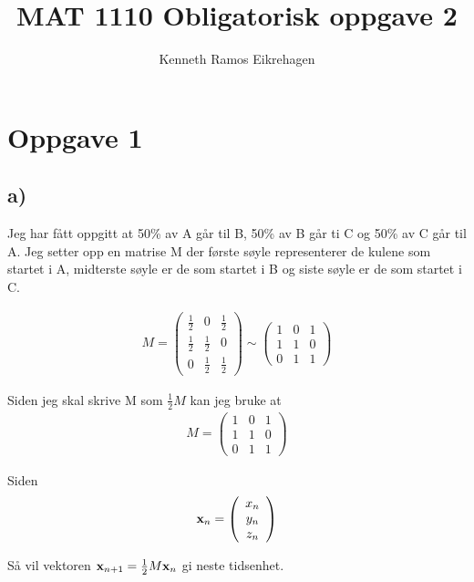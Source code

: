 \documentclass[a4paper,12pt,norsk]{article}
\title{MAT 1110 Obligatorisk oppgave 2}
\author{Kenneth Ramos Eikrehagen}
\begin{document}
\maketitle
\tableofcontents
\section{Oppgave 1}
\subsection{a)}
Jeg har fått oppgitt at 50\% av A går til B, 50\% av B går ti C og 50\% av C går til A. Jeg setter opp en matrise M der første søyle representerer de kulene som startet i A, midterste søyle er de som startet i B og siste søyle er de som startet i C. 

\begin{align*}
M =
\begin{pmatrix}
\frac{1}{2} & 0 & \frac{1}{2} \\
\frac{1}{2} & \frac{1}{2} & 0 \\
0 & \frac{1}{2} & \frac{1}{2}
\end{pmatrix}
\sim
\begin{pmatrix}
1 & 0 & 1 \\
1 & 1 & 0 \\
0 & 1 & 1
\end{pmatrix}
\end{align*}

Siden jeg skal skrive M som $\frac{1}{2}M$ kan jeg bruke at 
\begin{align*}
M =
\begin{pmatrix}
1 & 0 & 1 \\
1 & 1 & 0 \\
0 & 1 & 1
\end{pmatrix}
\end{align*}

Siden 
\begin{align*}
\bold{x}_n = 
\left({\begin{array}{cc} x_n\\ y_n\\ z_n  \end{array}}\right)
\end{align*}

Så vil vektoren $\bold{x}_{n+1} = \frac{1}{2}M\bold{x}_n$ gi neste tidsenhet. 
\end{document}
